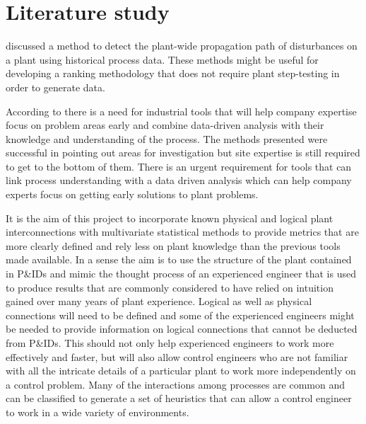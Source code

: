 \section{Literature study}





\citet{Bauer2005} discussed a method to detect the plant-wide propagation path of disturbances on a plant using historical process data.
These methods might be useful for developing a ranking methodology that does not require plant step-testing in order to generate data.


According to \citet{Bauer2005} there is a need for industrial tools that will help company expertise focus on problem areas early and combine data-driven analysis with their knowledge and understanding of the process.
The methods presented were successful in pointing out areas for investigation but site expertise is still required to get to the bottom of them.
There is an urgent requirement for tools that can link process understanding with a data driven analysis which can help company experts focus on getting early solutions to plant problems.

It is the aim of this project to incorporate known physical and logical plant interconnections with multivariate statistical methods to provide metrics that are more clearly defined and rely less on plant knowledge than the previous tools made available.
In a sense the aim is to use the structure of the plant contained in P\&IDs and mimic the thought process of an experienced engineer that is used to produce results that are commonly considered to have relied on intuition gained over many years of plant experience.
Logical as well as physical connections will need to be defined and some of the experienced engineers might be needed to provide information on logical connections that cannot be deducted from P\&IDs.
This should not only help experienced engineers to work more effectively and faster, but will also allow control engineers who are not familiar with all the intricate details of a particular plant to work more independently on a control problem.
Many of the interactions among processes are common and can be classified to generate a set of heuristics that can allow a control engineer to work in a wide variety of environments.

